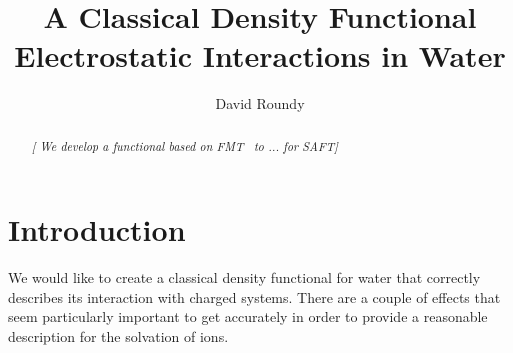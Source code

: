 \documentclass[letterpaper,twocolumn,amsmath,amssymb,prb]{revtex4-1}
\newcommand{\needsworklater}[1]{\emph{[#1]}}
\begin{document}
\title{A Classical Density Functional Electrostatic Interactions in Water }

\author{David Roundy}

\begin{abstract}
\needsworklater{ We develop a functional based on FMT~\cite{roth2002whitebear}
 to ... for SAFT}
\end{abstract}

\maketitle

\section{Introduction}
We would like to create a classical density functional for water that
correctly describes its interaction with charged systems.  There are a
couple of effects that seem particularly important to get accurately
in order to provide a reasonable description for the solvation of
ions.



\end{document}
